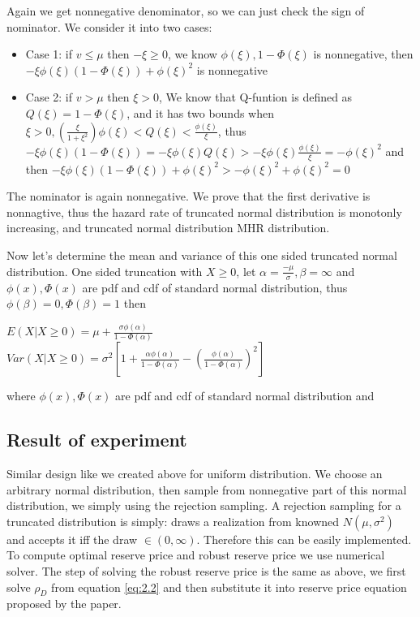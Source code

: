 Again we get nonnegative denominator, so we can just check the sign of nominator. We consider it into two cases:

\begin{itemize}
	\item Case 1: if $v \leqslant \mu$ then $-\xi \geqslant 0$, we know $\phi(\xi), 1-\Phi(\xi)$ is nonnegative, then $-\xi\phi(\xi)\left( 1 - \Phi(\xi) \right) + \phi(\xi)^2$ is nonnegative
	\item Case 2: if  $v > \mu$ then $\xi > 0$, We know that Q-funtion is defined as $Q(\xi) = 1- \Phi(\xi)$, and it has two bounds when $\xi > 0, \left( \frac{\xi}{1+\xi^2} \right)\phi(\xi) < Q(\xi) <\frac{\phi(\xi)}{\xi}$, thus  $-\xi\phi(\xi)\left( 1 - \Phi(\xi) \right) = -\xi\phi(\xi) Q(\xi)  > - \xi\phi(\xi)\frac{\phi(\xi)}{\xi} = -\phi(\xi)^2$ and then  $-\xi\phi(\xi)\left( 1 - \Phi(\xi) \right) + \phi(\xi)^2 > -\phi(\xi)^2 + \phi(\xi)^2 = 0$
\end{itemize}

 The nominator is again nonnegative. We prove that the first derivative is nonnagtive, thus the hazard rate of truncated normal distribution is monotonly increasing, and truncated normal distribution MHR distribution. 



Now let's determine the mean and variance of this one sided truncated normal distribution.
One sided truncation with $X \geqslant 0$, let $\alpha = \frac{- \mu}{\sigma}, \beta = \infty$ and $\phi(x), \Phi(x) $ are pdf and cdf of standard normal distribution, thus $\phi(\beta) = 0, \Phi(\beta) = 1$ then 

\begin{center}
	$E(X | X \geqslant 0) = \mu + \frac{\sigma \phi(\alpha)}{1 - \Phi(\alpha)}$\\
	$Var( X | X \geqslant 0) = \sigma^2 [1+\frac{\alpha \phi(\alpha)}{1 - \Phi(\alpha)}-(\frac{ \phi(\alpha)}{1 - \Phi(\alpha)})^2]$
\end{center}
where $\phi(x), \Phi(x) $ are pdf and cdf of standard normal distribution
and \\



\subsection{Result of experiment}

Similar design like we created above for uniform distribution. We choose an arbitrary normal distribution, then sample from nonnegative part of this normal distribution, we simply using the rejection sampling. A rejection sampling for a truncated distribution is simply: draws a realization from knowned $N(\mu, \sigma^2)$ and accepts it iff the draw $\in (0,\infty)$. Therefore this can be easily implemented. To compute optimal reserve price and robust reserve price we use numerical solver.
The step of solving the robust reserve price is the same as above, we first solve $\rho_D$ from equation \ref{eq:2.2} and then substitute it into reserve price equation proposed by the paper.  
	
